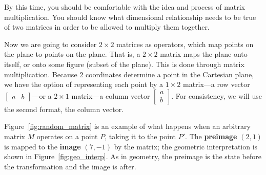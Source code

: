 \documentclass[../textbook.tex]{subfiles}
\begin{document}
\noindent By this time, you should be comfortable with the idea and process of matrix multiplication. You should know what dimensional relationship needs to be true of two matrices in order to be allowed to multiply them together.

Now we are going to consider $2\times 2$ matrices as operators, which map points on the plane to points on the plane. That is, a $2\times 2$ matrix maps the plane onto itself, or onto some figure (subset of the plane). This is done through matrix multiplication. Because $2$ coordinates determine a point in the Cartesian plane, we have the option of representing each point by a $1\times 2$ matrix---a row vector $\left[\begin{array}{cc}a & b \end{array}\right]$---or a $2\times 1$ matrix---a column vector $\left[\begin{array}{c}a \\ b \end{array}\right]$. For consistency, we will use the second format, the column vector.

Figure~\ref{fig:random_matrix} is an example of what happens when an arbitrary matrix $M$ operates on a point $P$, taking it to the point $P'$. The \textbf{preimage} $(2,1)$ is mapped to the \textbf{image} $(7, -1)$ by the matrix; the geometric interpretation is shown in Figure~\ref{fig:geo_interp}. As in geometry, the preimage is the state before the transformation and the image is after.

\end{document}
